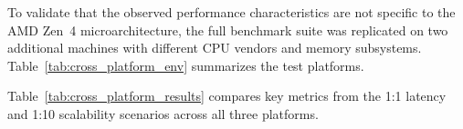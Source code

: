 To validate that the observed performance characteristics are not specific to the AMD Zen~4 microarchitecture, the full benchmark suite was replicated on two additional machines with different CPU vendors and memory subsystems. Table~\ref{tab:cross_platform_env} summarizes the test platforms.

\begin{table}[htbp]
    \centering
    \caption{Benchmark platform specifications for cross-platform comparison.}
    \label{tab:cross_platform_env}
\end{table}

Table~\ref{tab:cross_platform_results} compares key metrics from the 1:1 latency and 1:10 scalability scenarios across all three platforms.

